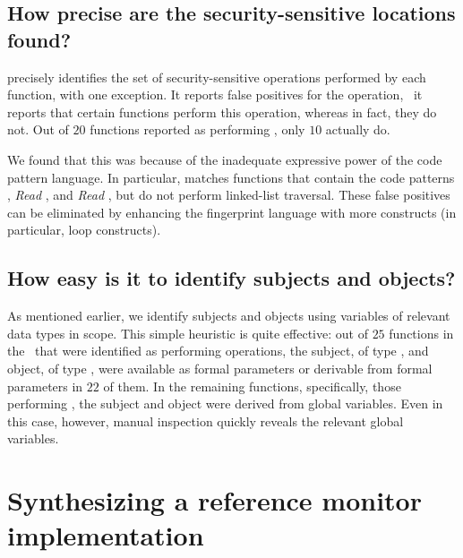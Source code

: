 %
\subsection{How precise are the security-sensitive locations found?}
%
 precisely identifies the set of
security-sensitive operations performed by each function, with one exception.
It reports false positives for the  operation, \ie\ it
reports that certain functions perform this operation, whereas in fact, they do
not.  Out of $20$ functions reported as performing , only
$10$ actually do.

We found that this was because of the inadequate expressive power of the code
pattern language. In particular,  matches
functions that contain the code patterns ,
\textit{Read} , and \textit{Read}
, but do not perform linked-list traversal. These
false positives can be eliminated by enhancing the fingerprint language with
more constructs (in particular, loop constructs).

\subsection{How easy is it to identify subjects and objects?} 
%
As mentioned earlier, we identify subjects and objects using variables of
relevant data types in scope. This simple heuristic is quite effective: out of
$25$ functions in the \xserver\ that were identified as performing
 operations, the subject, of type , and object, of
type , were available as formal parameters or derivable from
formal parameters in $22$ of them. In the remaining functions, specifically,
those performing , the subject and object were derived
from global variables. Even in this case, however, manual inspection quickly
reveals the relevant global variables.
%

\section{Synthesizing a reference monitor implementation}
\label{chapter:matching:section:refmonsynth}

